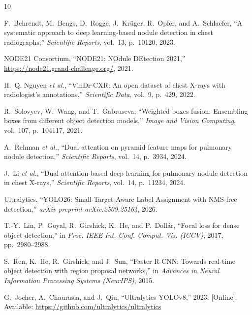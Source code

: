 \documentclass[conference]{IEEEtran}
\begin{document}
\begin{thebibliography}{10}

F.~Behrendt, M.~Bengs, D.~Rogge, J.~Kr\"{u}ger, R.~Opfer, and
A.~Schlaefer, ``A systematic approach to deep learning-based nodule detection
in chest radiographs,'' \textit{Scientific Reports}, vol.~13, p.~10120, 2023.

NODE21 Consortium, ``NODE21: NOdule DEtection 2021,''
\url{https://node21.grand-challenge.org/}, 2021.

H.~Q. Nguyen \textit{et al.}, ``VinDr-CXR: An open dataset of chest X-rays
with radiologist's annotations,'' \textit{Scientific Data}, vol.~9, p.~429,
2022.

R.~Solovyev, W.~Wang, and T.~Gabruseva, ``Weighted boxes fusion: Ensembling
boxes from different object detection models,'' \textit{Image and Vision
Computing}, vol.~107, p.~104117, 2021.

A.~Rehman \textit{et al.}, ``Dual attention on pyramid feature maps for
pulmonary nodule detection,'' \textit{Scientific Reports}, vol.~14, p.~3934,
2024.

J.~Li \textit{et al.}, ``Dual attention-based deep learning for pulmonary
nodule detection in chest X-rays,'' \textit{Scientific Reports}, vol.~14,
p.~11234, 2024.

Ultralytics, ``YOLO26: Small-Target-Aware Label Assignment with NMS-free
detection,'' \textit{arXiv preprint arXiv:2509.25164}, 2026.

T.-Y.~Lin, P.~Goyal, R.~Girshick, K.~He, and P.~Doll\'{a}r, ``Focal loss for
dense object detection,'' in \textit{Proc. IEEE Int. Conf. Comput. Vis.
(ICCV)}, 2017, pp.~2980--2988.

S.~Ren, K.~He, R.~Girshick, and J.~Sun, ``Faster R-CNN: Towards real-time
object detection with region proposal networks,'' in \textit{Advances in Neural
Information Processing Systems (NeurIPS)}, 2015.

G.~Jocher, A.~Chaurasia, and J.~Qiu, ``Ultralytics YOLOv8,'' 2023. [Online].
Available: \url{https://github.com/ultralytics/ultralytics}

\end{thebibliography}

\balance
\end{document}
